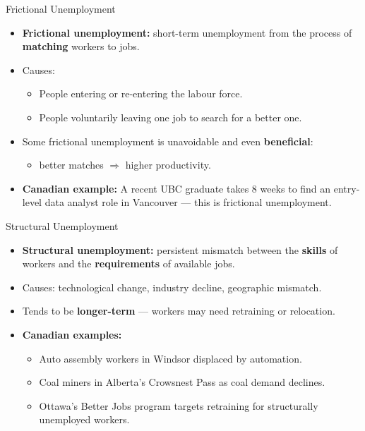 \documentclass[aspectratio=169]{beamer}
\begin{document}
\begin{frame}{Frictional Unemployment}
\transfade
\begin{itemize}
  \item \textbf{Frictional unemployment:} short-term unemployment from the process of \textbf{matching} workers to jobs.
  \item Causes:
  \begin{itemize}
    \item People entering or re-entering the labour force.
    \item People voluntarily leaving one job to search for a better one.
  \end{itemize}
  \item Some frictional unemployment is \alert{unavoidable} and even \textbf{beneficial}:
  \begin{itemize}
    \item better matches $\Rightarrow$ higher productivity.
  \end{itemize}
  \item \textbf{Canadian example:} A recent UBC graduate takes 8 weeks to find an entry-level data analyst role in Vancouver --- this is frictional unemployment.
\end{itemize}
\end{frame}

\begin{frame}{Structural Unemployment}
\transfade
\begin{itemize}
  \item \textbf{Structural unemployment:} persistent mismatch between the \textbf{skills} of workers and the \textbf{requirements} of available jobs.
  \item Causes: technological change, industry decline, geographic mismatch.
  \item Tends to be \textbf{longer-term} --- workers may need retraining or relocation.
  \item \textbf{Canadian examples:}
  \begin{itemize}
    \item Auto assembly workers in Windsor displaced by automation.
    \item Coal miners in Alberta's Crowsnest Pass as coal demand declines.
    \item Ottawa's Better Jobs program targets retraining for structurally unemployed workers.
  \end{itemize}
\end{itemize}
\end{frame}
\end{document}
